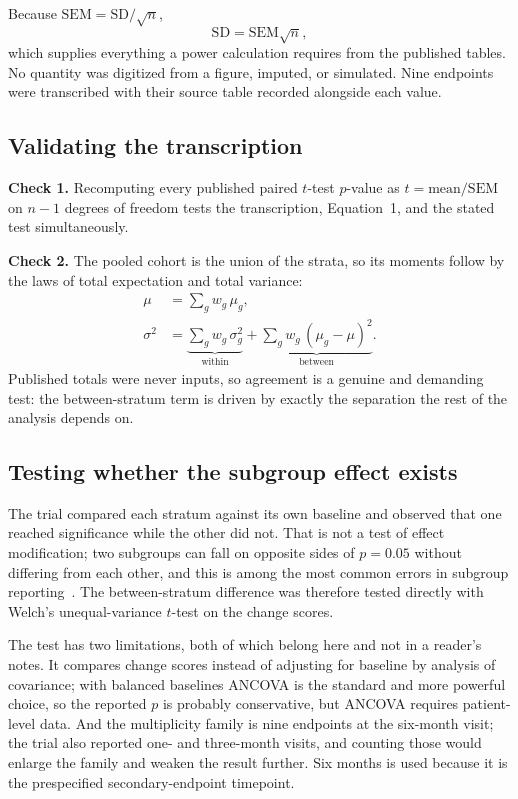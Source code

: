 \documentclass[10pt,twocolumn,letterpaper]{article}
\begin{document}
Because $\mathrm{SEM}=\mathrm{SD}/\sqrt{n}$,
\begin{equation}
\mathrm{SD} = \mathrm{SEM}\sqrt{n},
\end{equation}
which supplies everything a power calculation requires from the published tables. No quantity was
digitized from a figure, imputed, or simulated. Nine endpoints were transcribed with their source
table recorded alongside each value.

\subsection{Validating the transcription}

\textbf{Check 1.} Recomputing every published paired $t$-test $p$-value as
$t=\text{mean}/\mathrm{SEM}$ on $n-1$ degrees of freedom tests the transcription, Equation~1, and
the stated test simultaneously.

\textbf{Check 2.} The pooled cohort is the union of the strata, so its moments follow by the laws of
total expectation and total variance:
\begin{align}
\mu &= \textstyle\sum_g w_g\,\mu_g,\\
\sigma^2 &= \underbrace{\textstyle\sum_g w_g\,\sigma_g^2}_{\text{within}}
          + \underbrace{\textstyle\sum_g w_g\,(\mu_g-\mu)^2}_{\text{between}}.
\end{align}
Published totals were never inputs, so agreement is a genuine and demanding test: the between-stratum
term is driven by exactly the separation the rest of the analysis depends on.

\subsection{Testing whether the subgroup effect exists}

The trial compared each stratum against its own baseline and observed that one reached significance
while the other did not. That is not a test of effect modification; two subgroups can fall on
opposite sides of $p=0.05$ without differing from each other, and this is among the most common
errors in subgroup reporting~\cite{wang2007, sun2010}. The between-stratum difference was therefore
tested directly with Welch's unequal-variance $t$-test on the change scores.

The test has two limitations, both of which belong here and not in a reader's notes. It compares
change scores instead of adjusting for baseline by analysis of covariance; with balanced baselines ANCOVA
is the standard and more powerful choice, so the reported $p$ is probably conservative, but ANCOVA
requires patient-level data. And the multiplicity family is nine endpoints at the six-month visit;
the trial also reported one- and three-month visits, and counting those would enlarge the family and
weaken the result further. Six months is used because it is the prespecified secondary-endpoint
timepoint.
\end{document}
